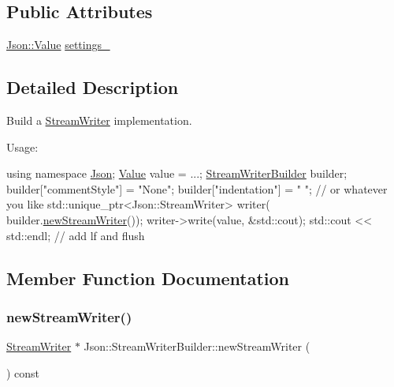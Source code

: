 \subsection*{Public Attributes}
\begin{DoxyCompactItemize}
\item 
\hyperlink{classJson_1_1Value}{Json\+::\+Value} \hyperlink{classJson_1_1StreamWriterBuilder_a79bdf2e639a52f4e758c0b95bd1d3423}{settings\+\_\+}
\end{DoxyCompactItemize}


\subsection{Detailed Description}
Build a \hyperlink{classJson_1_1StreamWriter}{Stream\+Writer} implementation. 

Usage\+: 
\begin{DoxyCode}
\textcolor{keyword}{using namespace }\hyperlink{namespaceJson}{Json};
\hyperlink{classJson_1_1Value}{Value} value = ...;
\hyperlink{classJson_1_1StreamWriterBuilder}{StreamWriterBuilder} builder;
builder[\textcolor{stringliteral}{"commentStyle"}] = \textcolor{stringliteral}{"None"};
builder[\textcolor{stringliteral}{"indentation"}] = \textcolor{stringliteral}{"   "};  \textcolor{comment}{// or whatever you like}
std::unique\_ptr<Json::StreamWriter> writer(
    builder.\hyperlink{classJson_1_1StreamWriterBuilder_ab9ee278609f88ae04a7c1a84e1f559e6}{newStreamWriter}());
writer->write(value, &std::cout);
std::cout << std::endl;  \textcolor{comment}{// add lf and flush}
\end{DoxyCode}
 

\subsection{Member Function Documentation}
\mbox{\label{classJson_1_1StreamWriterBuilder_ab9ee278609f88ae04a7c1a84e1f559e6}} 
\subsubsection{\texorpdfstring{new\+Stream\+Writer()}{newStreamWriter()}}
{\footnotesize\ttfamily \hyperlink{classJson_1_1StreamWriter}{Stream\+Writer} $\ast$ Json\+::\+Stream\+Writer\+Builder\+::new\+Stream\+Writer (\begin{DoxyParamCaption}{ }\end{DoxyParamCaption}) const\hspace{0.3cm}{\ttfamily [virtual]}}


